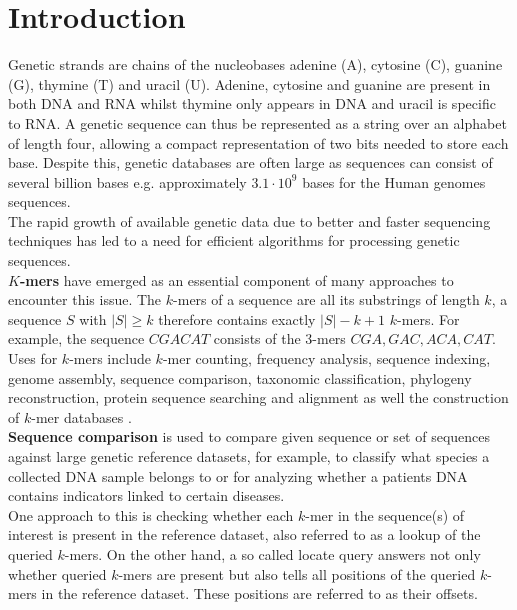 \documentclass[a4paper,titlepage,onecolumn,oneside,12pt,nenglish,titlepage=firstiscover]{scrbook}
\theoremstyle{plain} %
\theoremstyle{definition} %
\theoremstyle{remark} %
\theoremstyle{plain}
\begin{document}
\newpage
\tableofcontents
\newpage

\chapter{Introduction} \label{chap:introduction}
Genetic strands are chains of the nucleobases adenine (A), cytosine (C), guanine (G), thymine (T) and uracil (U). Adenine, cytosine and guanine are present in both DNA and RNA whilst thymine only appears in DNA and uracil is specific to RNA. A genetic sequence can thus be represented as a string over an alphabet of length four, allowing a compact representation of two bits needed to store each base. Despite this, genetic databases are often large as sequences can consist of several billion bases e.g. approximately $3.1 \cdot 10^9$ bases for the Human genomes sequences. \\
The rapid growth of available genetic data due to better and faster sequencing techniques has led to a need for efficient algorithms for processing genetic sequences.\\

\textbf{$K$-mers} have emerged as an essential component of many approaches to encounter this issue. The $k$-mers of a sequence are all its substrings of length $k$, a sequence $S$ with $|S| \geq k$ therefore contains exactly $|S|-k+1$ $k$-mers. For example, the sequence $CGACAT$ consists of the 3-mers $CGA,GAC,ACA,CAT$.\\
Uses for $k$-mers include $k$-mer counting, frequency analysis, sequence indexing, genome assembly, sequence comparison, taxonomic classification, phylogeny reconstruction, protein sequence searching and alignment as well the construction of $k$-mer databases \cite{moeckel_survey_2024}.\\

\textbf{Sequence comparison} is used to compare given sequence or set of sequences against large genetic reference datasets, for example, to classify what species a collected DNA sample belongs to or for analyzing whether a patients DNA contains indicators linked to certain diseases.\\
One approach to this is checking whether each $k$-mer in the sequence(s) of interest is present in the reference dataset, also referred to as a lookup of the queried $k$-mers. On the other hand, a so called locate query answers not only whether queried $k$-mers are present but also tells all positions of the queried $k$-mers in the reference dataset. These positions are referred to as their offsets.\\
\end{document}
